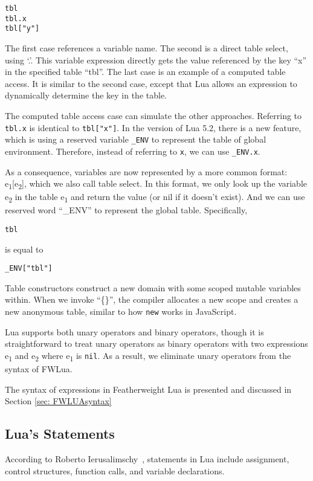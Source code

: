 \begin{verbatim}
tbl
tbl.x
tbl["y"]
\end{verbatim}

The first case references a variable name.
The second is a direct table select, using `.'.
This variable expression directly gets the value referenced by the key ``x'' in the specified table ``tbl''.
The last case is an example of a computed table access.
It is similar to the second case, except that Lua allows an expression to dynamically determine the key in the table.

The computed table access case can simulate the other approaches.
Referring to {\tt tbl.x} is identical to {\tt tbl["x"]}.
In the version of Lua 5.2, there is a new feature, which is using a reserved variable {\tt \_ENV} to represent the table of global environment.
Therefore, instead of referring to {\tt x}, we can use {\tt \_ENV.x}.

As a consequence, variables are now represented by a more common format: e\textsubscript{1}[e\textsubscript{2}], which we also call table select. In this format, we only look up the variable e\textsubscript{2} in the table e\textsubscript{1} and return the value (or nil if it doesn't exist). And we can use reserved word ``\_ENV'' to represent the global table. Specifically,

\begin{verbatim}
tbl
\end{verbatim}
is equal to
\begin{verbatim}
_ENV["tbl"]
\end{verbatim}

Table constructors
construct a new domain with some scoped mutable variables within.
When we invoke ``\{\}'', the compiler allocates a new scope
and creates a new anonymous table, similar to how {\tt new} works in JavaScript.

Lua supports both
unary operators and binary operators, though it is straightforward to treat unary operators as binary operators
with two expressions e\textsubscript{1} and e\textsubscript{2} where e\textsubscript{1} is {\tt nil}.
As a result, we eliminate unary operators from the syntax of FWLua.

The syntax of expressions in Featherweight Lua is presented and discussed in Section \ref{sec: FWLUAsyntax}

\subsection{Lua's Statements}
According to Roberto Ierusalimschy~\cite{PIL},
statements in Lua include assignment, control structures, function calls, and variable declarations.

